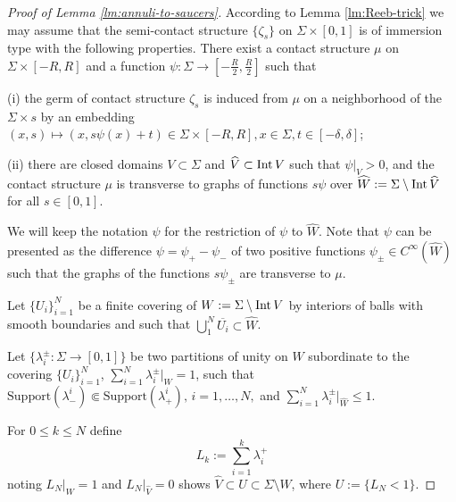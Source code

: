 \documentclass[12pt]{paper}
\theoremstyle{plain}
\theoremstyle{definition}
\newcommand{\wh}{\widehat}
\newcommand{\Int}{{\rm Int\,}} %
\newcommand{\Supp}{\mathrm{Support}}
\numberwithin{figure}{section}
\begin{document}
\begin{proof}[Proof of Lemma \ref{lm:annuli-to-saucers}]
According to  Lemma \ref{lm:Reeb-trick}
 we  may assume that 
  the semi-contact structure $\{\zeta_s\}$ on 
  $\Sigma\times[0,1]$  is of immersion type  with   the following properties. There exist  a contact structure $\mu$ on $\Sigma\times[-R,R]$ and a function $\psi:\Sigma\to [-\frac R2,\frac R2]$ such that
  \begin{description}
  \item{(i)} the germ of contact structure $\zeta_s$ is induced from $\mu$ on  a neighborhood of the $\Sigma\times s$ by an embedding $(x,s)\mapsto (x, s\psi(x)+t)\in\Sigma\times[-R,R] , x\in\Sigma, t\in[-\delta,\delta]$;
  \item {(ii)}
 there  are closed domains $V\subset\Sigma$ and $\wh V\subset \Int V$ such that $\psi|_V >0$,  and the contact structure $\mu$ is transverse to   graphs of functions $s\psi $ over $\wh W:=\Sigma\setminus\Int\wh V$ for all $s\in[0,1]$.
\end{description}
 
  We will keep the notation  $\psi$ for  the restriction of $\psi$ to $\wh W$.
  Note that $\psi$ can be presented as the difference
  $\psi=\psi_+-\psi_-$ of two positive functions $\psi_\pm \in C^\infty(\wh W)$such that  the graphs of the functions $s\psi_\pm$ are transverse to $\mu$. 
  
  Let $\{U_i\}_{i=1}^N$   be a  finite covering  of $W:=\Sigma\setminus\Int V$ by interiors of balls with smooth boundaries and such that $\bigcup\limits_1^N\overline{U_i}\subset \wh W$.
   
 
   Let $\{\lambda^\pm_i: \Sigma \to [0,1]\}$ be two partitions of unity on $W$ subordinate to the covering  $\{U_i\}_{i=1}^N$,   $
   \sum_{i=1}^N\lambda^\pm_i|_{W}=1$, such that
   $\Supp(\lambda^i_-)\Subset\Supp(\lambda^i_+),\, i=1,\dots, N,$  
   and $   \sum_{i=1}^N\lambda^\pm_i|_{\wh W}\leq 1$.
      
       For $0 \leq k \leq N$ define 
   $$L_k:=\sum_{i=1}^k\lambda^+_i
   $$
   noting $L_N|_{W}=1$ and $L_N|_{\wh V}=0$ shows $\wh V \subset U \subset \Sigma \setminus W$,
   where $U:= \{L_N < 1\}$.




\end{proof}
\end{document}
